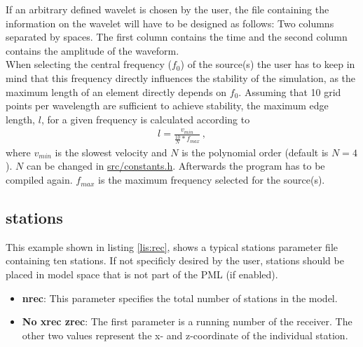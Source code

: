     	If an arbitrary defined wavelet is chosen by the user, the file containing the information on the wavelet will have to be designed as follows: Two columns separated by spaces. The first column contains the time and the second column contains the amplitude of the waveform. \\
 
    	When selecting the central frequency ($f_0$) of the source(s) the user has to keep in mind that this frequency directly influences the stability of the simulation, as the maximum length of an element directly depends on $f_0$. Assuming that 10 grid points per wavelength are sufficient to achieve stability, the maximum edge length, $l$, for a given frequency is calculated according to
    	\begin{align*}
    		l = \frac{v_{min}}{\frac{10}{N} * f_{max}}\,,
		\end{align*}
		where $v_{min}$ is the slowest velocity and $N$ is the polynomial order (default is $N = 4$). $N$ can be changed in \url{src/constants.h}. Afterwards the program has to be compiled again. $f_{max}$ is the maximum frequency selected for the source(s).  	   
    \subsection{stations}
    \label{subsec:stations}
    	This example shown in listing \ref{lis:rec}, shows a typical stations parameter file containing ten stations. If not specificly desired by the user, stations should be placed in model space that is not part of the PML (if enabled).
     
    
			\begin{itemize}
				\item \textbf{nrec}: This parameter specifies the total number of stations in the model.
				\item \textbf{No xrec zrec}: The first parameter is a running number of the receiver. The other two values represent the x- and z-coordinate of the individual station.
			\end{itemize}			    		 		
